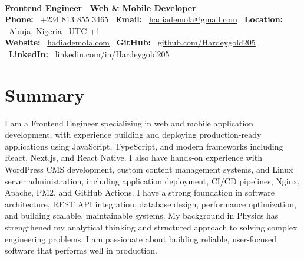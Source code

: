 \documentclass{article}
\newcommand{\resumename}[1]{{\textls[50]{\fontsize{24pt}{24pt}\selectfont\textbf{#1}}}}
\newcommand{\jobtitle}[1]{{\fontsize{14pt}{13.5pt}\selectfont\textbf{#1}}}
\newcommand{\contactinfo}[1]{{\fontsize{11pt}{13pt}\selectfont\color{black!70}#1}}
\begin{document}
\begin{center}
    \resumename{Hadi Ademola Surajudeen} \\[0.1cm]
    \jobtitle{Frontend Engineer \textbar\ Web \& Mobile Developer} \\[0.1cm]
    \contactinfo{
        \textbf{Phone:} \ +234 813 855 3465 \textbar\ 
        \textbf{Email:} \ \href{mailto:hadiademola@gmail.com}{hadiademola@gmail.com} \textbar\ 
        \textbf{Location:} \ Abuja, Nigeria \textbar\ UTC +1
    } \\[0.1cm]
    \contactinfo{
        \textbf{Website:} \ \href{https://hadiademola.vercel.app}{hadiademola.com} \textbar\
        \textbf{GitHub:} \ \href{https://github.com/Hardeygold205}{github.com/Hardeygold205} \textbar\ 
        \textbf{LinkedIn:} \ \href{https://linkedin.com/in/Hardeygold205}{linkedin.com/in/Hardeygold205}
    }
\end{center}

\vspace{-0.1cm}

\section{Summary}
I am a Frontend Engineer specializing in web and mobile application development, with experience building and deploying production-ready applications using JavaScript, TypeScript, and modern frameworks including React, Next.js, and React Native. I also have hands-on experience with WordPress CMS development, custom content management systems, and Linux server administration, including application deployment, CI/CD pipelines, Nginx, Apache, PM2, and GitHub Actions. I have a strong foundation in software architecture, REST API integration, database design, performance optimization, and building scalable, maintainable systems. My background in Physics has strengthened my analytical thinking and structured approach to solving complex engineering problems. I am passionate about building reliable, user-focused software that performs well in production.

\vspace{0.1cm}
\end{document}
